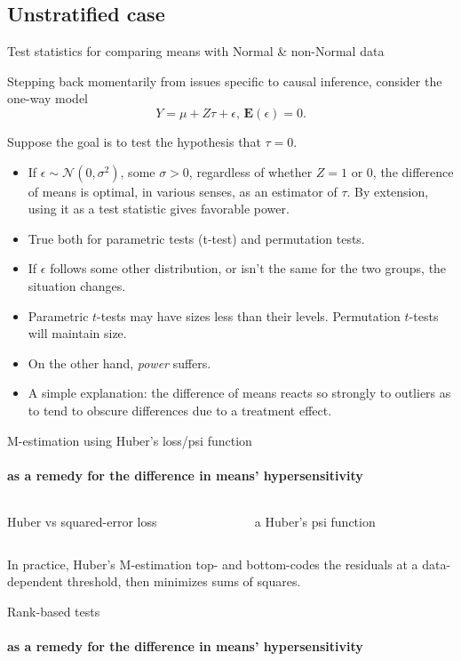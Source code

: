 \subsection{Unstratified case}
\begin{frame}{Test statistics for comparing means with Normal \& non-Normal data}

Stepping back momentarily from issues specific to causal inference, consider the one-way model
$$
Y = \mu + Z\tau + \epsilon,\, \mathbf{E}(\epsilon) = 0.
$$

Suppose the goal is to test the hypothesis that $\tau = 0$. 
  
\begin{itemize}[<+->]
\item If $\epsilon \sim \mathcal{N}(0, \sigma^{2})$, some $\sigma >0$, regardless of whether $Z=1$ or 0, the difference of means is optimal, in various senses, as an estimator of $\tau$. By extension, using it as a test statistic gives favorable power.
\item True both for parametric tests (t-test) and permutation tests. 
\item If $\epsilon$ follows some other distribution, or isn't the same for the two groups, the situation changes.
\item Parametric $t$-tests may have sizes less than their levels. Permutation $t$-tests will maintain size.
\item On the other hand, \textit{power} suffers.
\item A simple explanation: the difference of means reacts so strongly to outliers as to tend to obscure differences due to a treatment effect.
\end{itemize}
\end{frame}

\begin{frame}{M-estimation using Huber's loss/psi function} \framesubtitle{as a remedy for the difference in means' hypersensitivity}
  \begin{columns}
    \begin{Column}
          \begin{center}
         { Huber vs squared-error loss} 
    \end{center}
    \end{Column}
    \begin{Column}
          \begin{center}a
         { Huber's psi function} 
    \end{center}

    \end{Column}
  \end{columns}
\pause
In practice, Huber's M-estimation top- and bottom-codes the residuals at a data-dependent threshold, then minimizes sums of squares.
\end{frame}
\begin{frame}{Rank-based tests } \framesubtitle{as a remedy for the difference in means' hypersensitivity}
  
\end{frame}
